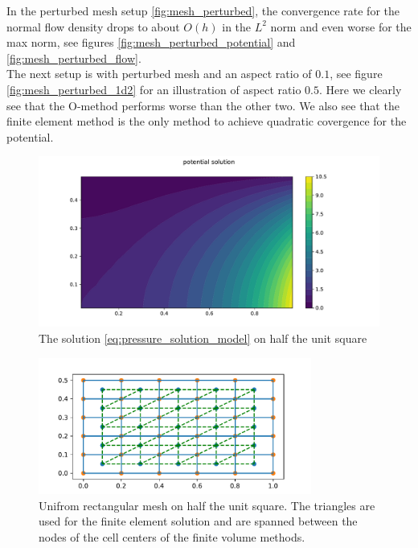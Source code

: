\documentclass[../Main/main.tex]{subfiles}
\begin{document}
		In the perturbed mesh setup \ref{fig:mesh_perturbed}, the convergence rate for the normal flow density drops to about $O(h)$ in the $L^2$ norm and even worse for the max norm, see figures \ref{fig:mesh_perturbed_potential} and \ref{fig:mesh_perturbed_flow}.\\
		The next setup is with perturbed mesh and an aspect ratio of $0.1$, see figure \ref{fig:mesh_perturbed_1d2} for an illustration of aspect ratio $0.5$. Here we clearly see that the O-method performs worse than the other two. We also see that the finite element method is the only method to achieve quadratic covergence for the potential.
		\begin{figure}[h]
			\centering
			\includegraphics[width=1\textwidth]{Potential.pdf}
			\caption{The solution \eqref{eq:pressure_solution_model} on half the unit square }
			\label{fig:solution}
		\end{figure}
		\newpage
		\begin{figure}[H]
			\centering
			\includegraphics[width=0.8\textwidth]{mesh_quadratic.pdf}
			\caption{Unifrom rectangular mesh on half the unit square. The triangles are used for the finite element solution and are spanned between the nodes of the cell centers of the finite volume methods.}
			\label{fig:mesh_uniform}
		\end{figure}
\end{document}
